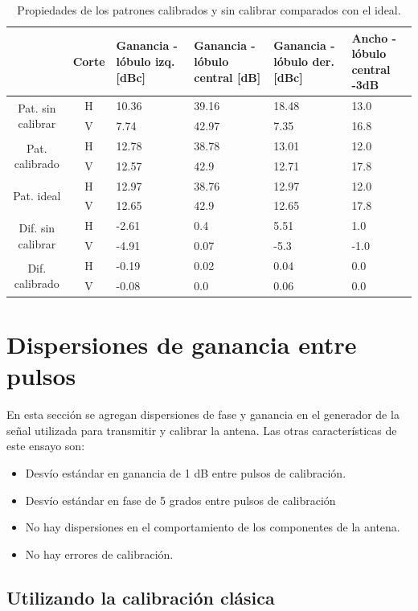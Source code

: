 \begin{table}[H]
  \footnotesize
  \centering
  \begin{tabular}{|c|c|p{2cm}|p{2.5cm}|p{2.5cm}|p{2.5cm}|}
    \cline{2-6}
    \multicolumn{1}{c|}{} & Corte & Ganancia - lóbulo izq. [dBc] & Ganancia - lóbulo central [dB] &
    Ganancia - lóbulo der. [dBc] & Ancho - lóbulo central -3dB \tabularnewline\hline
    \multirow{2}{2cm}{Pat. sin calibrar} & H & 10.36 & 39.16 & 18.48 & 13.0 \tabularnewline\cline{2-6}
     & V & 7.74 & 42.97 & 7.35 & 16.8 \tabularnewline\hline
    \multirow{2}{2cm}{Pat. calibrado} & H & 12.78 & 38.78 & 13.01 & 12.0 \tabularnewline\cline{2-6}
     & V & 12.57 & 42.9 & 12.71 & 17.8 \tabularnewline\hline
    \multirow{2}{2cm}{Pat. ideal} & H & 12.97 & 38.76 & 12.97 & 12.0 \tabularnewline\cline{2-6}
     & V & 12.65 & 42.9 & 12.65 & 17.8 \tabularnewline\hline
    \multirow{2}{2cm}{Dif. sin calibrar} & H & -2.61 & 0.4 & 5.51 & 1.0\tabularnewline\cline{2-6}
     & V & -4.91 & 0.07 & -5.3 & -1.0 \tabularnewline\hline
    \multirow{2}{2cm}{Dif. calibrado} & H & -0.19 & 0.02 & 0.04 & 0.0 \tabularnewline\cline{2-6}
     & V & -0.08 & 0.0 & 0.06 & 0.0 \tabularnewline\hline
  \end{tabular}
  \caption{Propiedades de los patrones calibrados y sin calibrar comparados con el ideal.}
  \label{tab:compErrMutual10degRow}
\end{table}


\section{Dispersiones de ganancia entre pulsos}

En esta sección se agregan dispersiones de fase y ganancia en el generador de la señal utilizada para transmitir y calibrar 
la antena. Las otras características de este ensayo son:
\begin{itemize}
	\item Desvío estándar en ganancia de 1 dB entre pulsos de calibración.
	\item Desvío estándar en fase de 5 grados entre pulsos de calibración
	\item No hay dispersiones en el comportamiento de los componentes de la antena.
	\item No hay errores de calibración.
\end{itemize}

\subsection{Utilizando la calibración clásica}

